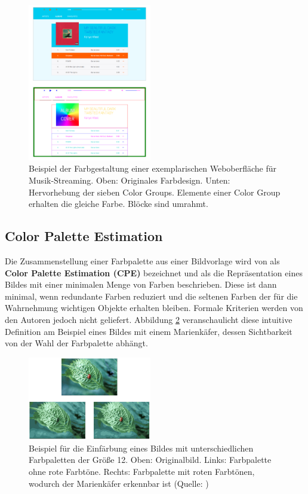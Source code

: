 \documentclass[10pt,a4paper,bibliography=totoc,twocolumn]{scrartcl}
\begin{document}
\begin{figure}[h]
	\centering
	\includegraphics[width=0.48\textwidth]{img/color_groups.png}
	\caption{Beispiel der Farbgestaltung einer exemplarischen Weboberfläche für Musik-Streaming. Oben: Originales Farbdesign. Unten: Hervorhebung der sieben Color Groups. Elemente einer Color Group erhalten die gleiche Farbe. Blöcke sind umrahmt.}
	\label{fig:colorgroups}
\end{figure}

\subsection{Color Palette Estimation}

Die Zusammenstellung einer Farbpalette aus einer Bildvorlage wird von \citet{acopa} als \textbf{Color Palette Estimation (CPE)} bezeichnet und als die Repräsentation eines Bildes mit einer minimalen Menge von Farben beschrieben. Diese ist dann minimal, wenn redundante Farben reduziert und die seltenen Farben der für die Wahrnehmung wichtigen Objekte erhalten bleiben. Formale Kriterien werden von den Autoren jedoch nicht geliefert. Abbildung \ref{fig:ladybug} veranschaulicht diese intuitive Definition am Beispiel eines Bildes mit einem Marienkäfer, dessen Sichtbarkeit von der Wahl der Farbpalette abhängt.

\begin{figure}
\centering
\includegraphics[width=0.48\textwidth]{img/ladybug.png}
\caption{Beispiel für die Einfärbung eines Bildes mit unterschiedlichen Farbpaletten der Größe 12. Oben: Originalbild. Links: Farbpalette ohne rote Farbtöne. Rechts: Farbpalette mit roten Farbtönen, wodurch der Marienkäfer erkennbar ist (Quelle: \citep{acopa})}
\label{fig:ladybug}
\end{figure}
\end{document}
